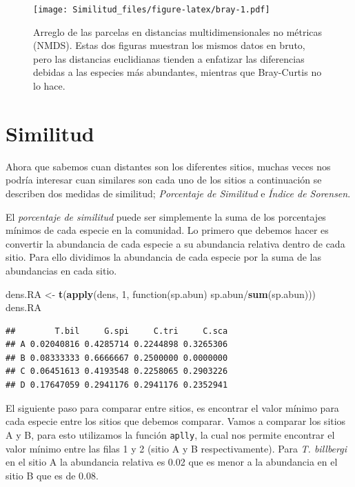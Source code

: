 \documentclass[]{book}
\newenvironment{Shaded}{\begin{snugshade}}{\end{snugshade}}
\newcommand{\KeywordTok}[1]{\textcolor[rgb]{0.13,0.29,0.53}{\textbf{{#1}}}}
\newcommand{\DecValTok}[1]{\textcolor[rgb]{0.00,0.00,0.81}{{#1}}}
\newcommand{\StringTok}[1]{\textcolor[rgb]{0.31,0.60,0.02}{{#1}}}
\newcommand{\NormalTok}[1]{{#1}}
\begin{document}
\begin{figure}[htbp]
\centering
\texttt{[image: Similitud\_files/figure-latex/bray-1.pdf]}
\caption{\label{fig:bray}Arreglo de las parcelas en distancias
multidimensionales no métricas (NMDS). Estas dos figuras muestran los
mismos datos en bruto, pero las distancias euclidianas tienden a
enfatizar las diferencias debidas a las especies más abundantes,
mientras que Bray-Curtis no lo hace.}
\end{figure}

\section{Similitud}\label{similitud}

Ahora que sabemos cuan distantes son los diferentes sitios, muchas veces
nos podría interesar cuan similares son cada uno de los sitios a
continuación se describen dos medidas de similitud; \emph{Porcentaje de
Similitud} e \emph{Índice de Sorensen}.

El \emph{porcentaje de similitud} puede ser simplemente la suma de los
porcentajes mínimos de cada especie en la comunidad. Lo primero que
debemos hacer es convertir la abundancia de cada especie a su abundancia
relativa dentro de cada sitio. Para ello dividimos la abundancia de cada
especie por la suma de las abundancias en cada sitio.

\begin{Shaded}
\begin{Highlighting}[]
\NormalTok{dens.RA <-}\StringTok{ }\KeywordTok{t}\NormalTok{(}\KeywordTok{apply}\NormalTok{(dens, }\DecValTok{1}\NormalTok{, function(sp.abun) sp.abun/}\KeywordTok{sum}\NormalTok{(sp.abun)))}
\NormalTok{dens.RA}
\end{Highlighting}
\end{Shaded}

\begin{verbatim}
##        T.bil     G.spi     C.tri     C.sca
## A 0.02040816 0.4285714 0.2244898 0.3265306
## B 0.08333333 0.6666667 0.2500000 0.0000000
## C 0.06451613 0.4193548 0.2258065 0.2903226
## D 0.17647059 0.2941176 0.2941176 0.2352941
\end{verbatim}

El siguiente paso para comparar entre sitios, es encontrar el valor
mínimo para cada especie entre los sitios que debemos comparar. Vamos a
comparar los sitios A y B, para esto utilizamos la función
\texttt{aplly}, la cual nos permite encontrar el valor mínimo entre las
filas 1 y 2 (sitio A y B respectivamente). Para \emph{T. billbergi} en
el sitio A la abundancia relativa es 0.02 que es menor a la abundancia
en el sitio B que es de 0.08.
\end{document}
